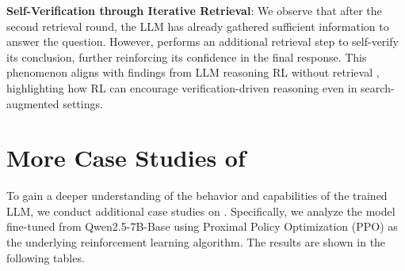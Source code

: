 \textbf{Self-Verification through Iterative Retrieval}: We observe that after the second retrieval round, the LLM has already gathered sufficient information to answer the question. However, \Ours performs an additional retrieval step to self-verify its conclusion, further reinforcing its confidence in the final response. This phenomenon aligns with findings from LLM reasoning RL without retrieval \citep{guo2025deepseek}, highlighting how RL can encourage verification-driven reasoning even in search-augmented settings.


\newpage
\section{More Case Studies of \Ours}\label{sec:apx:case-all}

To gain a deeper understanding of the behavior and capabilities of the trained LLM, we conduct additional case studies on \Ours. Specifically, we analyze the model fine-tuned from Qwen2.5-7B-Base using Proximal Policy Optimization (PPO) as the underlying reinforcement learning algorithm.
The results are shown in the following tables.












